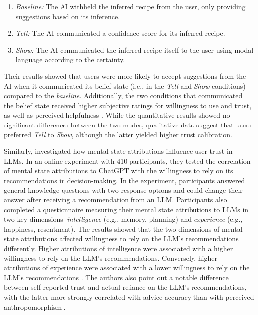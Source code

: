 \begin{enumerate}[label=(\arabic*)]
    \item \textit{Baseline:} The \ac{AI} withheld the inferred recipe from the user, only providing suggestions based on its inference.
    \item \textit{Tell:} The \ac{AI} communicated a confidence score for its inferred recipe.
    \item \textit{Show:} The \ac{AI} communicated the inferred recipe itself to the user using modal language according to the certainty.
\end{enumerate}

Their results showed that users were more likely to accept suggestions from the \ac{AI} when it communicated its belief state (i.e., in the \textit{Tell} and \textit{Show} conditions) compared to the \textit{baseline}. Additionally, the two conditions that communicated the belief state received higher subjective ratings for willingness to use and trust, as well as perceived helpfulness \parencite{Ying2024}. While the quantitative results showed no significant differences between the two modes, qualitative data suggest that users preferred \textit{Tell} to \textit{Show}, although the latter yielded higher trust calibration.

Similarly, \textcite{Colombatto2025} investigated how mental state attributions influence user trust in \acp{LLM}. In an online experiment with 410 participants, they tested the correlation of mental state attributions to ChatGPT with the willingness to rely on its recommendations in decision-making. In the experiment, participants answered general knowledge questions with two response options and could change their answer after receiving a recommendation from an \ac{LLM}. Participants also completed a questionnaire measuring their mental state attributions to \acp{LLM} in two key dimensions: \textit{intelligence} (e.g., memory, planning) and \textit{experience} (e.g., happiness, resentment). The results showed that the two dimensions of mental state attributions affected willingness to rely on the \ac{LLM}'s recommendations differently. Higher attributions of intelligence were associated with a higher willingness to rely on the \ac{LLM}'s recommendations. Conversely, higher attributions of experience were associated with a lower willingness to rely on the \ac{LLM}'s recommendations \parencite{Colombatto2025}. The authors also point out a notable difference between self-reported trust and actual reliance on the \ac{LLM}'s recommendations, with the latter more strongly correlated with advice accuracy than with perceived anthropomorphism \parencite{Colombatto2025}.

